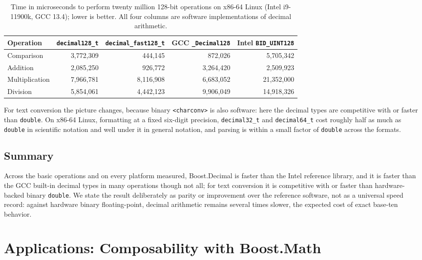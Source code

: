 \documentclass[acmsmall]{acmart}
\begin{document}
\begin{table}
  \caption{Time in microseconds to perform twenty million 128-bit operations on x86-64
    Linux (Intel i9-11900k, GCC 13.4); lower is better. All four columns are software
    implementations of decimal arithmetic.}
  \label{tab:perf128}
  \footnotesize
  \begin{tabular}{lrrrr}
    \toprule
    Operation & \texttt{decimal128\_t} & \texttt{decimal\_fast128\_t} & GCC \texttt{\_Decimal128} & Intel \texttt{BID\_UINT128} \\
    \midrule
    Comparison     & 3,772,309 & 444,145   & 872,026   & 5,705,342 \\
    Addition       & 2,085,250 & 926,772   & 3,264,420 & 2,509,923 \\
    Multiplication & 7,966,781 & 8,116,908 & 6,683,052 & 21,352,000 \\
    Division       & 5,854,061 & 4,442,123 & 9,906,049 & 14,918,326 \\
    \bottomrule
  \end{tabular}
\end{table}

For text conversion the picture changes, because binary \texttt{<charconv>} is also
software: here the decimal types are competitive with or faster than \texttt{double}. On
x86-64 Linux, formatting at a fixed six-digit precision, \texttt{decimal32\_t} and
\texttt{decimal64\_t} cost roughly half as much as \texttt{double} in scientific notation
and well under it in general notation, and parsing is within a small factor of
\texttt{double} across the formats.

\subsection{Summary}
Across the basic operations and on every platform measured, Boost.Decimal is faster than
the Intel reference library, and it is faster than the GCC built-in decimal types in many
operations though not all; for text conversion it is competitive with or faster than
hardware-backed binary \texttt{double}. We state the result deliberately as parity or
improvement over the reference software, not as a universal speed record: against hardware
binary floating-point, decimal arithmetic remains several times slower, the expected cost
of exact base-ten behavior.

\section{Applications: Composability with Boost.Math}
\label{sec:applications}
\end{document}

